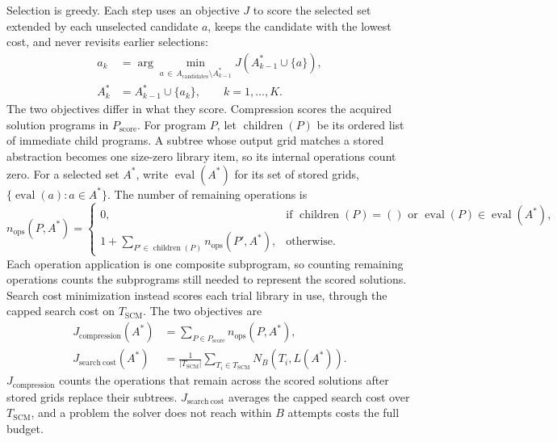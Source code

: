 \documentclass[10pt]{article}
\begin{document}
Selection is greedy. Each step uses an objective $J$ to score the selected
set extended by each unselected candidate $a$, keeps the candidate with the
lowest cost, and never revisits earlier selections:
\begin{equation}
  \begin{aligned}
    a_k
      &=\arg\min_{a\,\in\,A_{\mathrm{candidates}}\setminus A^{*}_{k-1}}
          J\!\left(A^{*}_{k-1}\cup\{a\}\right),\\
    A^{*}_{k}
      &=A^{*}_{k-1}\cup\{a_k\},
        \qquad k=1,\ldots,K.
  \end{aligned}
\end{equation}
The two objectives differ in what they score. Compression scores the acquired
solution programs in $P_{\mathrm{score}}$. For program $P$, let
$\operatorname{children}(P)$ be its ordered list of immediate child programs.
A subtree whose output grid matches a stored abstraction becomes one
size-zero library item, so its internal operations count zero. For a selected
set $A^{*}$, write $\operatorname{eval}(A^{*})$ for its set of stored grids,
$\{\operatorname{eval}(a) : a\in A^{*}\}$. The number of remaining operations
is
\begin{equation}
  n_{\mathrm{ops}}(P,A^{*})
  =
  \begin{cases}
    0,
      & \text{if }\operatorname{children}(P)=()
        \text{ or }\operatorname{eval}(P)\in\operatorname{eval}(A^{*}),\\
    1+\displaystyle\sum_{P'\in\operatorname{children}(P)}
        n_{\mathrm{ops}}(P',A^{*}),
      & \text{otherwise}.
  \end{cases}
\end{equation}
Each operation application is one composite subprogram, so counting
remaining operations counts the subprograms still needed to represent the
scored solutions.
Search cost minimization instead scores each trial library in use, through
the capped search cost on $T_{\mathrm{SCM}}$. The two objectives
are
\begin{equation}
  \begin{aligned}
    J_{\mathrm{compression}}(A^{*})
      &=\sum_{P\in P_{\mathrm{score}}}n_{\mathrm{ops}}(P,A^{*}),\\
    J_{\mathrm{search\ cost}}(A^{*})
      &=\frac{1}{|T_{\mathrm{SCM}}|}
        \sum_{T_i\in T_{\mathrm{SCM}}}
        N_B\!\left(T_i,L(A^{*})\right).
  \end{aligned}
\end{equation}
$J_{\mathrm{compression}}$ counts the operations that remain across the
scored solutions after stored grids replace their subtrees.
$J_{\mathrm{search\ cost}}$ averages the capped search cost over
$T_{\mathrm{SCM}}$, and a problem the solver does not reach within
$B$ attempts costs the full budget.
\end{document}
